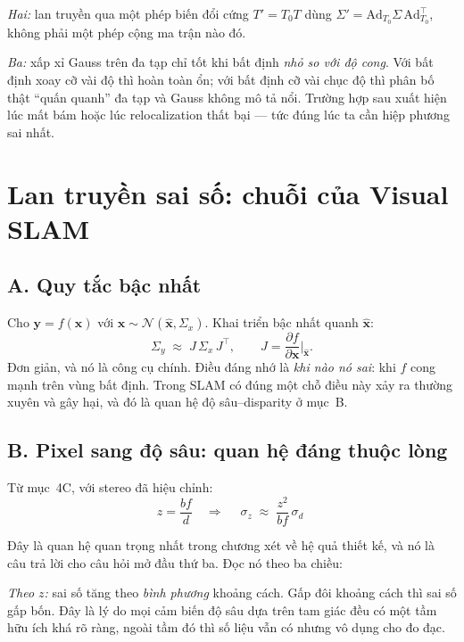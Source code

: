 \documentclass[../../vslam.tex]{subfiles}
\begin{document}
\emph{Hai:} lan truyền qua một phép biến đổi cứng \(T' = T_0 T\) dùng \(\Sigma' = \mathrm{Ad}_{T_0}\Sigma\,\mathrm{Ad}_{T_0}^{\top}\), không phải một phép cộng ma trận nào đó.

\emph{Ba:} xấp xỉ Gauss trên đa tạp chỉ tốt khi bất định \emph{nhỏ so với độ cong}. Với bất định xoay cỡ vài độ thì hoàn toàn ổn; với bất định cỡ vài chục độ thì phân bố thật ``quấn quanh'' đa tạp và Gauss không mô tả nổi. Trường hợp sau xuất hiện lúc mất bám hoặc lúc relocalization thất bại --- tức đúng lúc ta cần hiệp phương sai nhất.

\section{Lan truyền sai số: chuỗi của Visual SLAM}

\subsection{A. Quy tắc bậc nhất}

Cho \(\mathbf{y} = f(\mathbf{x})\) với \(\mathbf{x} \sim \mathcal{N}(\hat{\mathbf{x}},\Sigma_x)\). Khai triển bậc nhất quanh \(\hat{\mathbf{x}}\):
\[
\Sigma_y \;\approx\; J\,\Sigma_x\,J^{\top},
\qquad J = \frac{\partial f}{\partial\mathbf{x}}\Big|_{\hat{\mathbf{x}}}.
\]
Đơn giản, và nó là công cụ chính. Điều đáng nhớ là \emph{khi nào nó sai}: khi \(f\) cong mạnh trên vùng bất định. Trong SLAM có đúng một chỗ điều này xảy ra thường xuyên và gây hại, và đó là quan hệ độ sâu--disparity ở mục~B.

\subsection{B. Pixel sang độ sâu: quan hệ đáng thuộc lòng}

Từ  mục~4C, với stereo đã hiệu chỉnh:
\begin{equation}
z = \frac{bf}{d}
\quad\Longrightarrow\quad
\boxed{\;\sigma_z \;\approx\; \frac{z^2}{b f}\,\sigma_d\;}
\label{eq:a06-depth}
\end{equation}

Đây là quan hệ quan trọng nhất trong chương xét về hệ quả thiết kế, và nó là câu trả lời cho câu hỏi mở đầu thứ ba. Đọc nó theo ba chiều:

\emph{Theo \(z\):} sai số tăng theo \emph{bình phương} khoảng cách. Gấp đôi khoảng cách thì sai số gấp bốn. Đây là lý do mọi cảm biến độ sâu dựa trên tam giác đều có một tầm hữu ích khá rõ ràng, ngoài tầm đó thì số liệu vẫn có nhưng vô dụng cho đo đạc.
\end{document}

